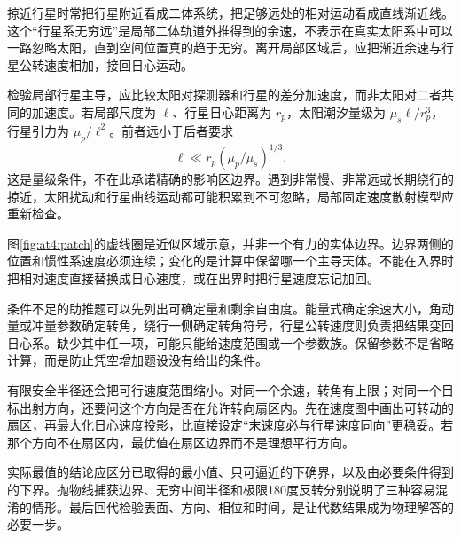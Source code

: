   掠近行星时常把行星附近看成二体系统，把足够远处的相对运动看成直线渐近线。这个“行星系无穷远”是局部二体轨道外推得到的余速，不表示在真实太阳系中可以一路忽略太阳，直到空间位置真的趋于无穷。离开局部区域后，应把渐近余速与行星公转速度相加，接回日心运动。

  检验局部行星主导，应比较太阳对探测器和行星的差分加速度，而非太阳对二者共同的加速度。若局部尺度为 $\ell$、行星日心距离为 $r_p$，太阳潮汐量级为 $\mu_s\ell/r_p^3$，行星引力为 $\mu_p/\ell^2$。前者远小于后者要求
  \[\ell\ll r_p(\mu_p/\mu_s)^{1/3}.\]
  这是量级条件，不在此承诺精确的影响区边界。遇到非常慢、非常远或长期绕行的掠近，太阳扰动和行星曲线运动都可能积累到不可忽略，局部固定速度散射模型应重新检查。
  

  图\ref{fig:at4:patch}的虚线圈是近似区域示意，并非一个有力的实体边界。边界两侧的位置和惯性系速度必须连续；变化的是计算中保留哪一个主导天体。不能在入界时把相对速度直接替换成日心速度，或在出界时把行星速度忘记加回。

  条件不足的助推题可以先列出可确定量和剩余自由度。能量式确定余速大小，角动量或冲量参数确定转角，绕行一侧确定转角符号，行星公转速度则负责把结果变回日心系。缺少其中任一项，可能只能给速度范围或一个参数族。保留参数不是省略计算，而是防止凭空增加题设没有给出的条件。

  有限安全半径还会把可行速度范围缩小。对同一个余速，转角有上限；对同一个目标出射方向，还要问这个方向是否在允许转向扇区内。先在速度图中画出可转动的扇区，再最大化日心速度投影，比直接设定“末速度必与行星速度同向”更稳妥。若那个方向不在扇区内，最优值在扇区边界而不是理想平行方向。

  实际最值的结论应区分已取得的最小值、只可逼近的下确界，以及由必要条件得到的下界。抛物线捕获边界、无穷中间半径和极限180度反转分别说明了三种容易混淆的情形。最后回代检验表面、方向、相位和时间，是让代数结果成为物理解答的必要一步。
  
